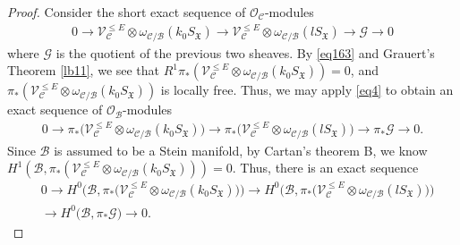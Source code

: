 \documentclass[12pt,b5paper,notitlepage]{report}
\theoremstyle{definition}
\theoremstyle{plain}
\newcommand{\fk}{\mathfrak}
\newcommand{\mc}{\mathcal}
\newcommand{\scr}{\mathscr}
\numberwithin{equation}{section}
\begin{document}
\begin{proof}
Consider the short exact sequence of $\scr O_{\mc C}$-modules
\begin{align*}
0\rightarrow \scr V_{\mc C}^{\leq E}\otimes\omega_{\mc C/\mc B}(k_0S_{\fk X})\rightarrow \scr V_{\mc C}^{\leq E}\otimes\omega_{\mc C/\mc B}(lS_{\fk X})\rightarrow\scr G\rightarrow 0
\end{align*}
where $\scr G$ is the quotient of the previous two sheaves. By \eqref{eq163} and Grauert's Theorem \ref{lb11}, we see that $R^1\pi_*(\scr V_{\mc C}^{\leq E}\otimes\omega_{\mc C/\mc B}(k_0S_{\fk X}))=0$, and $\pi_*(\scr V_{\mc C}^{\leq E}\otimes\omega_{\mc C/\mc B}(k_0S_{\fk X}))$ is locally free. Thus, we may apply  \eqref{eq4} to obtain an exact sequence of $\scr O_{\mc B}$-modules
\begin{align*}
0\rightarrow \pi_*\big(\scr V_{\mc C}^{\leq E}\otimes\omega_{\mc C/\mc B}(k_0S_{\fk X})\big)\rightarrow \pi_*\big(\scr V_{\mc C}^{\leq E}\otimes\omega_{\mc C/\mc B}(lS_{\fk X})\big)\rightarrow \pi_*\scr G\rightarrow 0.
\end{align*}
Since $\mc B$ is assumed to be a Stein manifold, by Cartan's theorem B, we know $H^1(\mc B,\pi_*(\scr V_{\mc C}^{\leq E}\otimes\omega_{\mc C/\mc B}(k_0S_{\fk X})))=0$. Thus, there is an exact sequence
\begin{align}
&0\rightarrow H^0\big(\mc B,\pi_*\big(\scr V_{\mc C}^{\leq E}\otimes\omega_{\mc C/\mc B}(k_0S_{\fk X})\big)\big)\rightarrow H^0\big(\mc B,\pi_*\big(\scr V_{\mc C}^{\leq E}\otimes\omega_{\mc C/\mc B}(lS_{\fk X})\big)\big)\nonumber\\
&\rightarrow H^0\big(\mc B,\pi_*\scr G\big)\rightarrow 0. \label{eq170}
\end{align}


\end{proof}
\end{document}
